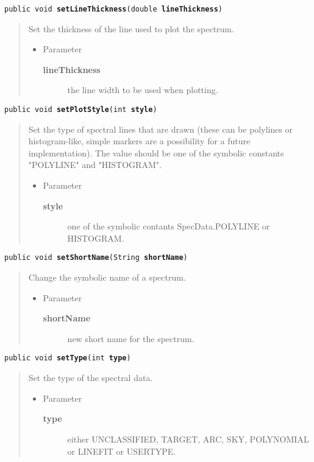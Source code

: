 \documentclass[twoside,11pt,nolof]{starlink}
\providecommand{\method}[1]{\texttt{#1}}
\newenvironment{desc}{\begin{quote}}{\end{quote}}
\begin{document}
\method{public void \textbf{setLineThickness}(\texttt{double} \textbf{lineThickness})\label{l109}\label{l110}}
\begin{desc}Set the thickness of the line used to plot the spectrum.
\begin{itemize}
\item{Parameter
  \begin{description}
   \item[\textbf{lineThickness}]{the line width to be used when plotting.}
  \end{description}}
\end{itemize}
\end{desc}

\method{public void \textbf{setPlotStyle}(\texttt{int} \textbf{style})\label{l111}\label{l112}}
\begin{desc}Set the type of spectral lines that are drawn (these can be
 polylines or histogram-like, simple markers are a possibility
 for a future implementation). The value should be one of the
 symbolic constants "POLYLINE" and "HISTOGRAM".
\begin{itemize}
\item{Parameter
  \begin{description}
   \item[\textbf{style}]{one of the symbolic contants SpecData.POLYLINE or
             HISTOGRAM.}
  \end{description}}
\end{itemize}
\end{desc}

\method{public void \textbf{setShortName}(\texttt{String} \textbf{shortName})\label{l113}\label{l114}}
\begin{desc}Change the symbolic name of a spectrum.
\begin{itemize}
\item{Parameter
  \begin{description}
   \item[\textbf{shortName}]{new short name for the spectrum.}
  \end{description}}
\end{itemize}
\end{desc}

\method{public void \textbf{setType}(\texttt{int} \textbf{type})\label{l115}\label{l116}}
\begin{desc}Set the type of the spectral data.
\begin{itemize}
\item{Parameter
  \begin{description}
   \item[\textbf{type}]{either UNCLASSIFIED, TARGET, ARC, SKY, POLYNOMIAL or
                    LINEFIT or USERTYPE.}
  \end{description}}
\end{itemize}
\end{desc}
\end{document}
